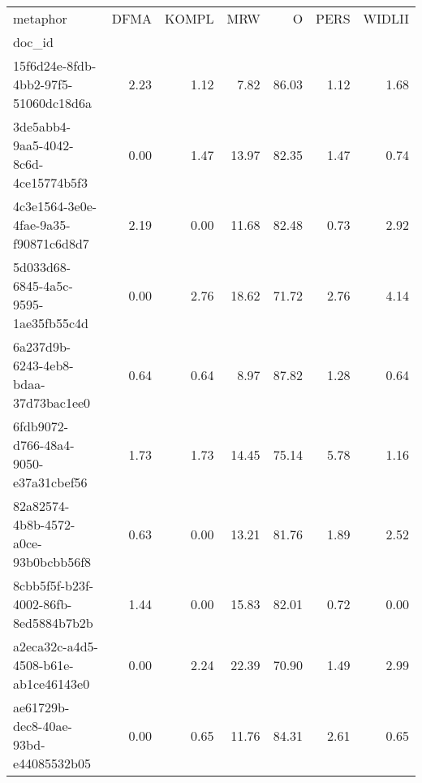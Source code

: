 \begin{tabular}{lrrrrrr}
\toprule
metaphor & DFMA & KOMPL & MRW & O & PERS & WIDLII \\
doc_id &  &  &  &  &  &  \\
\midrule
15f6d24e-8fdb-4bb2-97f5-51060dc18d6a & 2.23 & 1.12 & 7.82 & 86.03 & 1.12 & 1.68 \\
3de5abb4-9aa5-4042-8c6d-4ce15774b5f3 & 0.00 & 1.47 & 13.97 & 82.35 & 1.47 & 0.74 \\
4c3e1564-3e0e-4fae-9a35-f90871c6d8d7 & 2.19 & 0.00 & 11.68 & 82.48 & 0.73 & 2.92 \\
5d033d68-6845-4a5c-9595-1ae35fb55c4d & 0.00 & 2.76 & 18.62 & 71.72 & 2.76 & 4.14 \\
6a237d9b-6243-4eb8-bdaa-37d73bac1ee0 & 0.64 & 0.64 & 8.97 & 87.82 & 1.28 & 0.64 \\
6fdb9072-d766-48a4-9050-e37a31cbef56 & 1.73 & 1.73 & 14.45 & 75.14 & 5.78 & 1.16 \\
82a82574-4b8b-4572-a0ce-93b0bcbb56f8 & 0.63 & 0.00 & 13.21 & 81.76 & 1.89 & 2.52 \\
8cbb5f5f-b23f-4002-86fb-8ed5884b7b2b & 1.44 & 0.00 & 15.83 & 82.01 & 0.72 & 0.00 \\
a2eca32c-a4d5-4508-b61e-ab1ce46143e0 & 0.00 & 2.24 & 22.39 & 70.90 & 1.49 & 2.99 \\
ae61729b-dec8-40ae-93bd-e44085532b05 & 0.00 & 0.65 & 11.76 & 84.31 & 2.61 & 0.65 \\
\bottomrule
\end{tabular}
